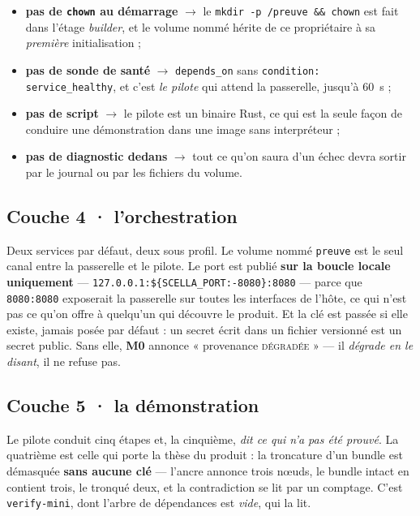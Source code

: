 \documentclass[11pt]{article}
\newcommand{\code}[1]{\texttt{\small #1}}
\newcommand{\mm}[1]{\textbf{#1}}
\newcommand{\fl}{$\rightarrow$}
\begin{document}
\begin{itemize}[leftmargin=1.1em,itemsep=1.5pt,topsep=2pt]
\item \textbf{pas de \code{chown} au démarrage} \fl{} le \code{mkdir -p /preuve \&\& chown} est fait
      dans l'étage \emph{builder}, et le volume nommé hérite de ce propriétaire à sa \emph{première}
      initialisation ;
\item \textbf{pas de sonde de santé} \fl{} \code{depends\_on} sans \code{condition:
      service\_healthy}, et c'est \emph{le pilote} qui attend la passerelle, jusqu'à 60~s ;
\item \textbf{pas de script} \fl{} le pilote est un binaire Rust, ce qui est la seule façon de
      conduire une démonstration dans une image sans interpréteur ;
\item \textbf{pas de diagnostic dedans} \fl{} tout ce qu'on saura d'un échec devra sortir par le
      journal ou par les fichiers du volume.
\end{itemize}

\subsection{Couche 4 · l'orchestration}
Deux services par défaut, deux sous profil. Le volume nommé \code{preuve} est le seul canal entre la
passerelle et le pilote. Le port est publié \textbf{sur la boucle locale uniquement} ---
\code{127.0.0.1:\$\{SCELLA\_PORT:-8080\}:8080} --- parce que \code{8080:8080} exposerait la
passerelle sur toutes les interfaces de l'hôte, ce qui n'est pas ce qu'on offre à quelqu'un qui
découvre le produit. Et la clé est passée si elle existe, jamais posée par défaut : un secret écrit
dans un fichier versionné est un secret public. Sans elle, \mm{M0} annonce « provenance
\textsc{dégradée} » --- il \emph{dégrade en le disant}, il ne refuse pas.

\subsection{Couche 5 · la démonstration}
Le pilote conduit cinq étapes et, la cinquième, \emph{dit ce qui n'a pas été prouvé}. La quatrième
est celle qui porte la thèse du produit : la troncature d'un bundle est démasquée \textbf{sans
aucune clé} --- l'ancre annonce trois nœuds, le bundle intact en contient trois, le tronqué deux, et
la contradiction se lit par un comptage. C'est \code{verify-mini}, dont l'arbre de dépendances est
\emph{vide}, qui la lit.
\end{document}
